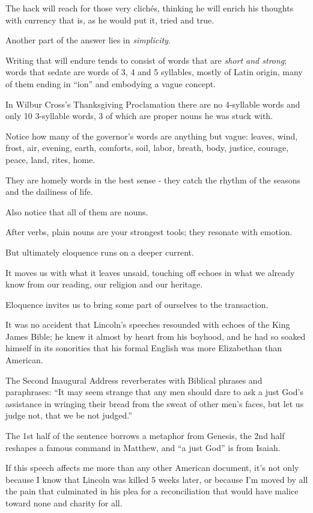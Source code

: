 \documentclass{book}
\numberwithin{equation}{section}
\begin{document}
The hack will reach for those very clich\'es, thinking he will enrich his thoughts with currency that is, as he would put it, tried and true.

Another part of the answer lies in \textit{simplicity}.

Writing that will endure tends to consist of words that are \textit{short and strong}; words that sedate are words of 3, 4 and 5 syllables, mostly of Latin origin, many of them ending in ``ion'' and embodying a vague concept.

In Wilbur Cross's Thanksgiving Proclamation there are no 4-syllable words and only 10 3-syllable words, 3 of which are proper nouns he was stuck with.

Notice how many of the governor's words are anything but vague: leaves, wind, frost, air, evening, earth, comforts, soil, labor, breath, body, justice, courage, peace, land, rites, home.

They are homely words in the best sense - they catch the rhythm of the seasons and the dailiness of life.

Also notice that all of them are nouns.

After verbs, plain nouns are your strongest tools; they resonate with emotion.

%
But ultimately eloquence runs on a deeper current.

It moves us with what it leaves unsaid, touching off echoes in what we already know from our reading, our religion and our heritage.

Eloquence invites us to bring some part of ourselves to the transaction.

It was no accident that Lincoln's speeches resounded with echoes of the King James Bible; he knew it almost by heart from his boyhood, and he had so soaked himself in its sonorities that his formal English was more Elizabethan than American.

The Second Inaugural Address reverberates with Biblical phrases and paraphrases: ``It may seem strange that any men should dare to ask a just God's assistance in wringing their bread from the sweat of other men's faces, but let us judge not, that we be not judged.''

The 1st half of the sentence borrows a metaphor from Genesis, the 2nd half reshapes a famous command in Matthew, and ``a just God'' is from Isaiah.

%
If this speech affects me more than any other American document, it's not only because I know that Lincoln was killed 5 weeks later, or because I'm moved by all the pain that culminated in his plea for a reconciliation that would have malice toward none and charity for all.
\end{document}
